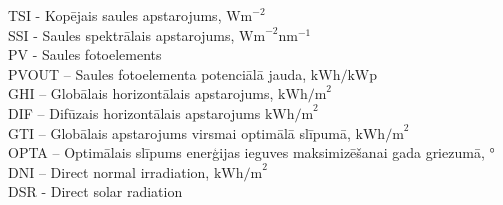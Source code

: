 \noindent TSI - Kopējais saules apstarojums, $\textrm{Wm}^{-2}$\\
SSI - Saules spektrālais apstarojums, $\textrm{Wm}^{-2}\textrm{nm}^{-1}$\\
PV - Saules fotoelements\\ %
PVOUT – Saules fotoelementa potenciālā jauda, $\textrm{kWh/kWp}$\\ %
GHI – Globālais horizontālais apstarojums,  $\textrm{kWh/m}^2$\\ %
DIF – Difūzais horizontālais apstarojums  $\textrm{kWh/m}^2$\\ %
GTI – Globālais apstarojums virsmai optimālā slīpumā, $\textrm{kWh/m}^2$\\ %
OPTA – Optimālais slīpums enerģijas ieguves maksimizēšanai gada griezumā, °\\ %
DNI – Direct normal irradiation, $\textrm{kWh/m}^2$\\ %
DSR - Direct solar radiation

